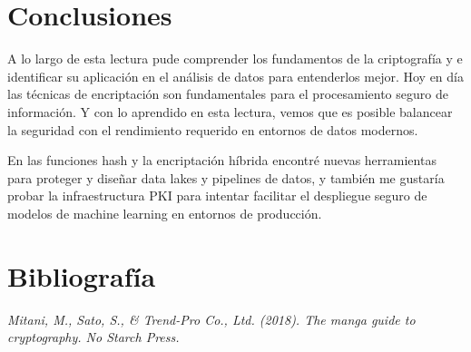 \documentclass{article}
\begin{document}
\section{Conclusiones}

    A lo largo de esta lectura pude comprender los fundamentos de la criptografía y e identificar 
    su aplicación en el análisis de datos para entenderlos mejor. Hoy en día las técnicas de encriptación 
    son fundamentales para el procesamiento seguro de información. Y con lo aprendido en esta lectura, vemos que 
    es posible balancear la seguridad con el rendimiento requerido en entornos de datos modernos.

    En las funciones hash y la encriptación híbrida encontré nuevas herramientas para 
    proteger y diseñar data lakes y pipelines de datos, y también me gustaría probar la infraestructura PKI para intentar facilitar el 
    despliegue seguro de modelos de machine learning en entornos de producción.

\section{Bibliografía}
\textit{Mitani, M., Sato, S., \& Trend-Pro Co., Ltd. (2018). The manga guide to cryptography. No
Starch Press.}
\end{document}
